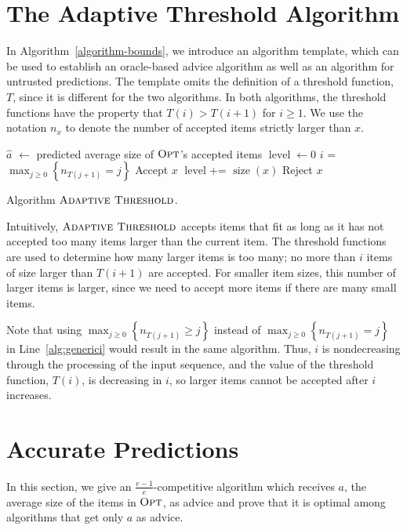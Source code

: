 \documentclass[a4paper,UKenglish,cleveref, autoref, thm-restate]{lipics-v2021}
\newcommand{\bALG}{\ensuremath{\operatorname{\textsc{Adaptive Threshold}}}\xspace}
\newcommand{\OPT}{\ensuremath{\operatorname{\textsc{Opt}}}\xspace}
\newcommand{\SET}[1]{\left\{#1\right\}}
\newcommand{\TF}{T}
\newcommand{\ASSIGN}{\ensuremath{\gets}\xspace}
\newcommand{\ITEMS}[1]{\ensuremath{n_{\!#1}}\xspace}
\newcommand{\SIZE}[1]{\ensuremath{\operatorname{\textrm{size}}(#1)}\xspace}
\newcommand{\LEVEL}{\ensuremath{\operatorname{\textrm{level}}}\xspace}
\newcommand{\guess}{\ensuremath{\hat{a}}\xspace}
\begin{document}
\section{The Adaptive Threshold Algorithm}

In Algorithm~\ref{algorithm-bounds}, we introduce an algorithm
template, which can be used to establish an oracle-based advice algorithm
as well as an algorithm for untrusted predictions.  The template omits the
definition of a threshold function, $\TF$, since it is different for the
two algorithms. In both algorithms, the threshold functions
 have the property that $\TF(i) > \TF(i+1)$ for
$i\geq 1$.  
We use the notation $\ITEMS{x}$ to denote the number of accepted items
strictly larger than $x$.

\begin{algorithm}
\begin{algorithmic}[1]
\State $\guess$ \ASSIGN predicted average size of \OPT's accepted items
\State \LEVEL \ASSIGN $0$
   \State $i$ = $\max_{j\geq 0}\SET{\ITEMS{\TF(j+1)}=j}$ \label{alg:generici}
   \If{$\SIZE{x} \leq \TF(i+1)$ \textbf{and} $\LEVEL + \SIZE{x} \leq 1$}
      \State Accept $x$
      \State \LEVEL += $\SIZE{x}$
   \Else
      \State Reject $x$
   \EndIf
\EndFor
\end{algorithmic}
\caption{Algorithm \bALG.}
\label{algorithm-bounds}
\end{algorithm}

Intuitively, \bALG accepts items that fit as long as it has not
accepted too many items larger than the current item. The threshold
functions are used to determine how many larger items is too many;
no more than $i$ items of size larger than $\TF(i+1)$ are accepted. For smaller
item sizes, this number of larger items is larger, since we need to
accept more items if there are many small items.

Note that using $\max_{j\geq 0}\SET{\ITEMS{\TF(j+1)} \geq j}$ instead of
$\max_{j\geq 0}\SET{\ITEMS{\TF(j+1)}=j}$ in Line~\ref{alg:generici}
would result in the same algorithm.  Thus, $i$ is nondecreasing
through the processing of the input sequence,  and the value of the
threshold function, $\TF(i)$, is decreasing in $i$, so larger items cannot
be accepted after $i$ increases.


\section{Accurate Predictions}
\label{sec:advice}
In this section, we give an $\frac{e-1}{e}$-competitive algorithm
which receives $a$, the average size of the items in \OPT, as advice
and prove that it is optimal among algorithms that get only $a$ as
advice.
\end{document}

